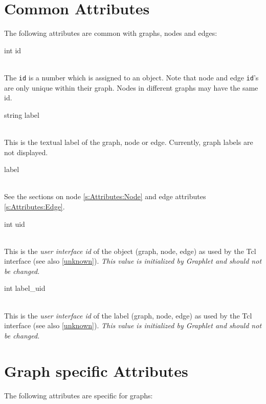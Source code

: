 \documentclass[twoside,fleqn]{report}
\begin{document}
%
%

\section{Common Attributes}
\label{s:Attributes:Common}

The following attributes are common with graphs, nodes and edges:

\begin{CAttributes}

  \item[int id] \strut\\
  The \texttt{id} is a number which is assigned to an object.
  Note that node and edge \texttt{id}'s are only unique within
  their graph. Nodes in different graphs may have the same id.
  
  \item[string label] \strut\\
  This is the textual label of the graph, node or edge. Currently,
  graph labels are not displayed.
  
  \item[\GT{Key} label] \strut\\
  See the sections on node \ref{s:Attributes:Node} and edge
  attributes \ref{s:Attributes:Edge}.
  
  \item[int uid] \strut\\
  This is the \emph{user interface id} of the object (graph,
  node, edge) as used by the Tcl interface (see also \ref{unknown}).
  \emph{This value is initialized by Graphlet and should not be changed.}

  \item[int label\_uid] \strut\\
  This is the \emph{user interface id} of the label (graph,
  node, edge) as used by the Tcl interface (see also \ref{unknown}).
  \emph{This value is initialized by Graphlet and should not be changed.}

\end{CAttributes}


%
%

\section{Graph specific Attributes}
\label{s:Attributes:Graph}

The following attributes are specific for graphs:
\end{document}
